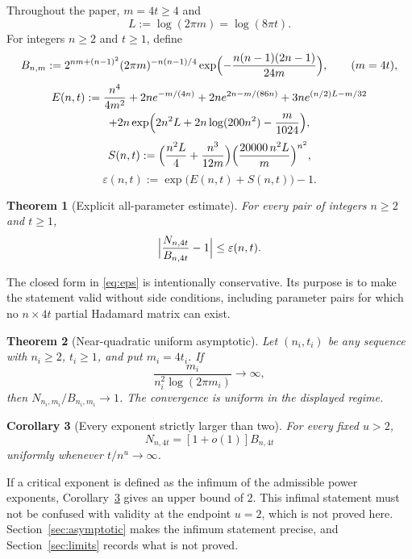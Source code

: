 \documentclass[11pt,reqno]{amsart}
\theoremstyle{plain}
\newtheorem{theorem}{Theorem}[section]
\newtheorem{corollary}[theorem]{Corollary}
\theoremstyle{definition}
\theoremstyle{remark}
\begin{document}
Throughout the paper, \(m=4t\ge4\) and
\[
  L:=\log(2\pi m)=\log(8\pi t).
\]
For integers \(n\ge2\) and \(t\ge1\), define
\begin{equation}\label{eq:B}
  B_{n,m}:=2^{nm+(n-1)^2}(2\pi m)^{-n(n-1)/4}
    \exp\Bigl(-\frac{n(n-1)(2n-1)}{24m}\Bigr),\qquad(m=4t),
\end{equation}
\begin{multline}\label{eq:E}
  E(n,t):=\frac{n^4}{4m^2}+2ne^{-m/(4n)}+2ne^{2n-m/(86n)}
    +3ne^{(n/2)L-m/32}\\
    +2n\exp\Bigl(2n^2L+2n\log(200n^2)-\frac m{1024}\Bigr),
\end{multline}
\begin{equation}\label{eq:S}
  S(n,t):=\Bigl(\frac{n^2L}4+\frac{n^3}{12m}\Bigr)
    \Bigl(\frac{20000\,n^2L}{m}\Bigr)^{n^2},
\end{equation}
\begin{equation}\label{eq:eps}
  \varepsilon(n,t):=\exp\bigl(E(n,t)+S(n,t)\bigr)-1.
\end{equation}

\begin{theorem}[Explicit all-parameter estimate]\label{thm:explicit}
For every pair of integers \(n\ge2\) and \(t\ge1\),
\[
  \Bigl|\frac{N_{n,4t}}{B_{n,4t}}-1\Bigr|\le\varepsilon(n,t).
\]
\end{theorem}

The closed form in \eqref{eq:eps} is intentionally conservative. Its purpose is
to make the statement valid without side conditions, including parameter pairs
for which no \(n\times4t\) partial Hadamard matrix can exist.

\begin{theorem}[Near-quadratic uniform asymptotic]\label{thm:uniform}
Let \((n_i,t_i)\) be any sequence with \(n_i\ge2\), \(t_i\ge1\), and put
\(m_i=4t_i\). If
\[
  \frac{m_i}{n_i^2\log(2\pi m_i)}\longrightarrow\infty,
\]
then \(N_{n_i,m_i}/B_{n_i,m_i}\to1\). The convergence is uniform in the
displayed regime.
\end{theorem}

\begin{corollary}[Every exponent strictly larger than two]\label{cor:exponent}
For every fixed \(u>2\),
\[
  N_{n,4t}=[1+o(1)]B_{n,4t}
\]
uniformly whenever \(t/n^u\to\infty\).
\end{corollary}

If a critical exponent is defined as the infimum of the admissible power
exponents, Corollary~\ref{cor:exponent} gives an upper bound of \(2\). This
infimal statement must not be confused with validity at the endpoint \(u=2\),
which is not proved here. Section~\ref{sec:asymptotic} makes the infimum
statement precise, and Section~\ref{sec:limits} records what is not proved.
\end{document}
